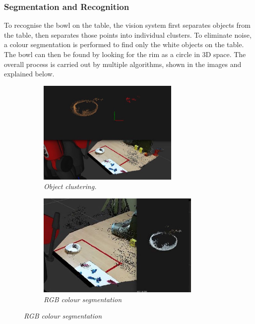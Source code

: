 \subsubsection{Segmentation and Recognition}
To recognise the bowl on the table, the vision system first separates objects from the table, then separates those points into individual clusters. To eliminate noise, a colour segmentation is performed to find only the white objects on the table. The bowl can then be found by looking for the rim as a circle in 3D space. The overall process is carried out by multiple algorithms, shown in the images and explained below.
\begin{figure}[ht!]
    \centering
    \begin{subfigure}[b]{0.475\textwidth}
        \centering
        \includegraphics[width=\textwidth, height=5cm]{regiongrowing.jpg}
        \caption{\textit{Object clustering.}}
    \end{subfigure}
    \hfill
    \begin{subfigure}[b]{0.475\textwidth}  
        \centering 
        \includegraphics[width=\textwidth, height=5cm]{whitecloud.jpg}
        \caption{\textit{RGB colour segmentation}}
    \end{subfigure}
\end{figure}
